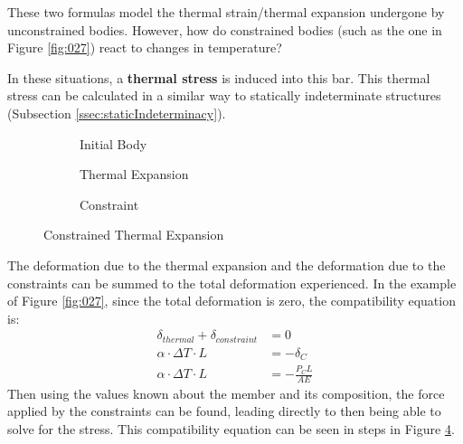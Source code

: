 \documentclass[12pt]{article}
\begin{document}
These two formulas model the thermal strain/thermal expansion undergone by unconstrained bodies. However, how do constrained bodies (such as the one in Figure \ref{fig:027}) react to changes in temperature?

In these situations, a \textbf{thermal stress} is induced into this bar. This thermal stress can be calculated in a similar way to statically indeterminate structures (Subsection \ref{ssec:staticIndeterminacy}).

\begin{figure}[H]
  \centering
  \begin{subfigure}[t!]{0.30\textwidth}
    \centering
    
    \caption{Initial Body}
    \label{fig:030}
  \end{subfigure}
  \begin{subfigure}[t!]{0.30\textwidth}
    \centering
    
    \caption{Thermal Expansion}
    \label{fig:031}
  \end{subfigure}
  \begin{subfigure}[t!]{0.38\textwidth}
    \centering
    
    \caption{Constraint}
    \label{fig:032}
  \end{subfigure}
  \caption{Constrained Thermal Expansion}
  \label{fig:constrainedThermalExpansion}
\end{figure}

The deformation due to the thermal expansion and the deformation due to the constraints can be summed to the total deformation experienced. In the example of Figure \ref{fig:027}, since the total deformation is zero, the compatibility equation is:
\begin{align*}
  \delta_{thermal} + \delta_{constraint} &= 0 \\
  \alpha \cdot \Delta T \cdot L &= - \delta_C \\
  \alpha \cdot \Delta T \cdot L &= -\frac{P_CL}{AE}
\end{align*}
Then using the values known about the member and its composition, the force applied by the constraints can be found, leading directly to then being able to solve for the stress. This compatibility equation can be seen in steps in Figure \ref{fig:constrainedThermalExpansion}.
\end{document}
